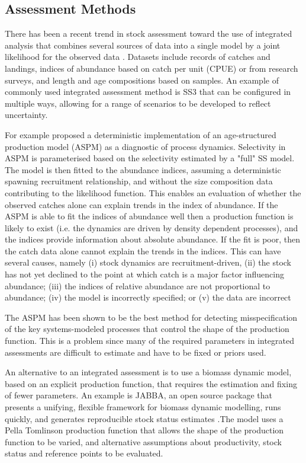 \subsection{Assessment Methods}

There has been a recent trend in stock assessment toward the use of integrated analysis that combines several sources of data into a single model by a joint likelihood for the observed data \parencite[e.g.][]{doubleday1976least,fournier1982general,maunder2013review}. Datasets include records of catches and landings, indices of abundance based on catch per unit (CPUE) or from research surveys, and length and age compositions based on samples. An example of commonly used integrated assessment method is SS3 that can be configured in multiple ways, allowing for a range of scenarios to be developed to reflect uncertainty.

For example \cite{maunder2015contemporary} proposed a deterministic implementation of an age-structured production model (ASPM) as a diagnostic of process dynamics. Selectivity in ASPM is parameterised based on the selectivity estimated by a "full" SS model. The model is then fitted to the abundance indices, assuming a deterministic spawning recruitment relationship, and without the size composition data contributing to the likelihood function. This enables an evaluation of whether the observed catches alone can explain trends in the index of abundance. If the ASPM is able to fit the indices of abundance well then a production function is likely to exist (i.e. the dynamics are driven by density dependent processes), and the indices provide information about absolute abundance. If  the fit is poor, then the catch data alone cannot explain the trends in the indices. This can have several causes, namely (i) stock dynamics are recruitment-driven, (ii) the stock has not yet declined to the point at which catch is a major factor influencing abundance; (iii) the indices of relative abundance are not proportional to abundance;  (iv) the model is incorrectly specified; or (v) the data are incorrect

The ASPM has been shown \parencite{carvalho2017can} to be the best method for detecting misspecification of the key systems-modeled processes that control the shape of the production function. This is a problem since many of the required parameters in integrated assessments are difficult to estimate \parencite[e.g.][]{lee2011m,lee2012steepness} and have to be fixed or priors used. 

An alternative to an integrated assessment is to use a biomass dynamic model, based on an explicit production function, that requires the estimation and fixing of fewer parameters. An example is JABBA, an open source package that presents a unifying, flexible framework for biomass dynamic modelling, runs quickly, and generates reproducible stock status estimates \parencite{winker2018jabba}.The model uses a Pella Tomlinson production function that allows the shape of the production function to be varied, and alternative assumptions about productivity, stock status and reference points to be evaluated. 

